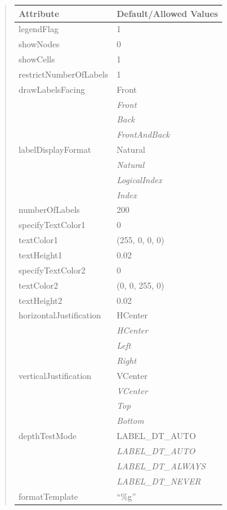 \documentclass[letterpaper,10pt,english]{sphinxmanual}
\begin{document}
\begin{quote}
\begin{longtable}{|l|l|}
\textbf{Attribute}
 & 
\textbf{Default/Allowed Values}
\\
\hline
legendFlag
 & 
1
\\
\hline
showNodes
 & 
0
\\
\hline
showCells
 & 
1
\\
\hline
restrictNumberOfLabels
 & 
1
\\
\hline
drawLabelsFacing
 & 
Front
\\
\hline & 
\emph{Front}
\\
\hline & 
\emph{Back}
\\
\hline & 
\emph{FrontAndBack}
\\
\hline
labelDisplayFormat
 & 
Natural
\\
\hline & 
\emph{Natural}
\\
\hline & 
\emph{LogicalIndex}
\\
\hline & 
\emph{Index}
\\
\hline
numberOfLabels
 & 
200
\\
\hline
specifyTextColor1
 & 
0
\\
\hline
textColor1
 & 
(255, 0, 0, 0)
\\
\hline
textHeight1
 & 
0.02
\\
\hline
specifyTextColor2
 & 
0
\\
\hline
textColor2
 & 
(0, 0, 255, 0)
\\
\hline
textHeight2
 & 
0.02
\\
\hline
horizontalJustification
 & 
HCenter
\\
\hline & 
\emph{HCenter}
\\
\hline & 
\emph{Left}
\\
\hline & 
\emph{Right}
\\
\hline
verticalJustification
 & 
VCenter
\\
\hline & 
\emph{VCenter}
\\
\hline & 
\emph{Top}
\\
\hline & 
\emph{Bottom}
\\
\hline
depthTestMode
 & 
LABEL\_DT\_AUTO
\\
\hline & 
\emph{LABEL\_DT\_AUTO}
\\
\hline & 
\emph{LABEL\_DT\_ALWAYS}
\\
\hline & 
\emph{LABEL\_DT\_NEVER}
\\
\hline
formatTemplate
 & 
``\%g''
\\
\hline\end{longtable}

\end{quote}
\end{document}
